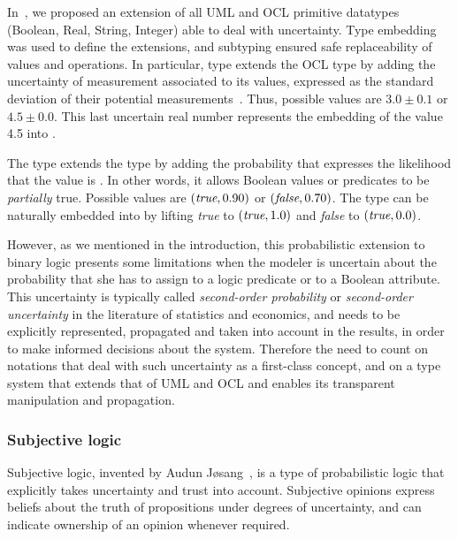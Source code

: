 In~\cite{BBMV19}, we proposed an extension of all UML and OCL primitive datatypes ({Boolean}, Real, String, Integer) able to deal with uncertainty. Type embedding was used to define the extensions, and subtyping ensured safe replaceability of values and operations. In particular, type  extends the OCL type  by adding the uncertainty of measurement associated to its values, expressed as the standard deviation of their potential measurements~\cite{JCGM100:2008}. Thus, possible  values are $3.0\pm0.1$ or $4.5\pm0.0$.
This last uncertain real number represents the embedding of the  value 4.5 into .

The type  extends the type  by adding the probability that expresses the likelihood that the value is . In other words, it allows Boolean values or predicates to be \emph{partially} true. %
Possible  values are $(\emph{true},0.90)$ or $(\emph{false},0.70)$. The type  can be naturally embedded into  by lifting \emph{true} to $(\emph{true},1.0)$ and \emph{false} to $(\emph{true},0.0)$.

However, as we mentioned in the introduction, this probabilistic extension to binary logic presents some limitations when the modeler is uncertain about the probability that she has to assign to a logic predicate or to a Boolean attribute. This uncertainty is typically called \emph{second-order probability} or \emph{second-order uncertainty} in the literature of statistics and economics, and needs to be explicitly represented, propagated and taken into account in the results, in order to make informed decisions about the system. Therefore the need to count on notations that deal with such uncertainty as a first-class concept, and on a type system that extends that of UML and OCL and enables its transparent manipulation and propagation.


\subsubsection{Subjective logic}

Subjective logic, invented by Audun Jøsang~\cite{Josang01,Josang16}, is a type of probabilistic logic that explicitly takes uncertainty and trust into account. Subjective opinions express beliefs about the truth of propositions under degrees of uncertainty, and can indicate ownership of an opinion whenever required.

